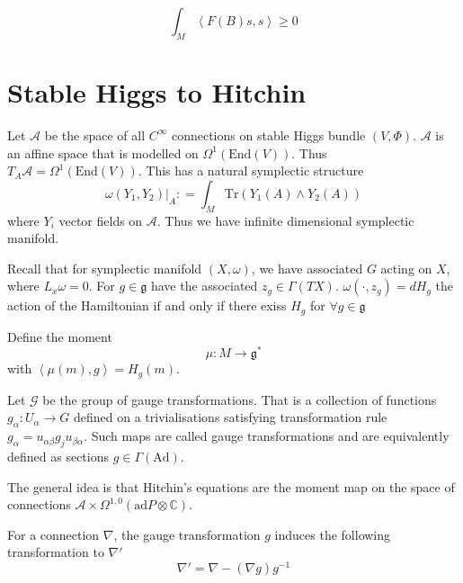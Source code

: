 \begin{equation}
    \int_M \left< F(B) s , s \right>  \geq 0 
\end{equation}




\section{Stable Higgs to Hitchin } %

Let $ \mathcal{A} $ be the space of all $C ^{\infty}$ connections on stable Higgs bundle $(V, \Phi)$. 
$\mathcal{A} $ is an affine space that is modelled on $ \Omega ^1(\mathrm{End}(V) )$. 
Thus $ T _ A \mathcal{A} = \Omega^1 ( \mathrm{End} ( V) ) $. 
This has a natural symplectic structure 
\begin{equation}
    \omega ( Y_1, Y_2 ) | _A : = \int _M \mathrm{Tr} (Y_1 ( A) \wedge Y_2 ( A) ) 
\end{equation}
where $Y_i$ vector fields on $ \mathcal{A} $. 
Thus we have infinite dimensional symplectic manifold. 

Recall that for symplectic manifold $(X, \omega)$, 
we have associated $G$ acting on $X$, where $ L_x \omega = 0 $. 
For $ g \in \mathfrak{g} $ have the associated $z_g \in \Gamma ( TX ) $.
$\omega( \cdot , z_g ) = d H_g $ the action of the Hamiltonian if and only if 
there exiss $ H_g$ for $ \forall g \in \mathfrak{g} $ 

Define the moment 
\begin{equation}
    \mu : M \rightarrow \mathfrak{g} ^ * 
\end{equation}
with $ \left< \mu (m) , g \right> = H_g ( m) $.

Let $ \mathcal{G} $ be the group of gauge transformations. 
That is a collection of functions $g_{\alpha} : U_{\alpha} \rightarrow  {G} $ defined on a trivialisations
satisfying transformation rule $ g_{\alpha} = u_{\alpha \beta} g_j u_{\beta \alpha }$. 
Such maps are called gauge transformations and are equivalently defined as sections $g \in \Gamma(\mathrm{Ad}) $.
 

The general idea is that Hitchin's equations are the moment map on the space of connections $\mathcal{A} \times \Omega^{1,0} ( \mathrm{ad}P \otimes \mathbb{C} ) $. 

For a connection $\nabla$, the gauge transformation $g$ induces the following transformation to $\nabla'$
\begin{equation}
    \nabla' = \nabla  - ( \nabla  g ) g^{-1} 
\end{equation}

